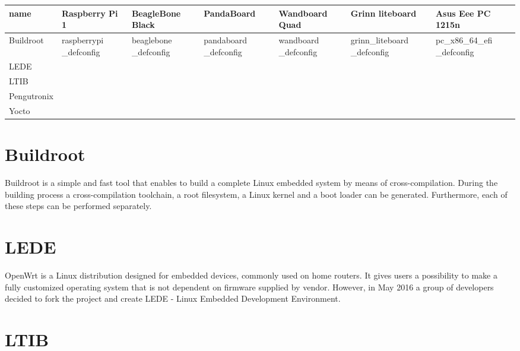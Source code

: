 \documentclass[printmode]{mgr}
\begin{document}
\begin{landscape}

\begin{table}
  \begin{tabular}{| p{2.5cm} | p{3cm} | p{3cm} | p{3cm} | p{3cm} | p{3cm} | p{3cm} |}
    \hline
    name & Raspberry Pi 1 & BeagleBone Black & PandaBoard & Wandboard Quad & Grinn liteboard & Asus Eee PC 1215n \\
    \hline
    Buildroot & raspberrypi \_defconfig &  beaglebone \_defconfig & pandaboard \_defconfig & wandboard \_defconfig & grinn\_liteboard \_defconfig & pc\_x86\_64\_efi \_defconfig \\
    \hline
    LEDE & & & & & & \\
    \hline
    LTIB & & & & & & \\
    \hline
    Pengutronix & & & & & & \\
    \hline
    Yocto & & & & & & \\
    \hline
  \end{tabular}
\end{table}

\end{landscape}



\section{Buildroot}

Buildroot is a simple and fast tool that enables to build a complete Linux embedded system by means of cross-compilation. During the building process a cross-compilation toolchain, a root filesystem, a Linux kernel and a boot loader can be generated.  Furthermore, each of these steps can be performed separately.

\section{LEDE}

OpenWrt is a Linux distribution designed for embedded devices, commonly used on home routers. It gives users a possibility to make a fully customized operating system that is not dependent on firmware supplied by vendor. However, in May 2016  a group of developers decided to fork the project and create LEDE - Linux Embedded Development Environment.

\section{LTIB}
\end{document}
